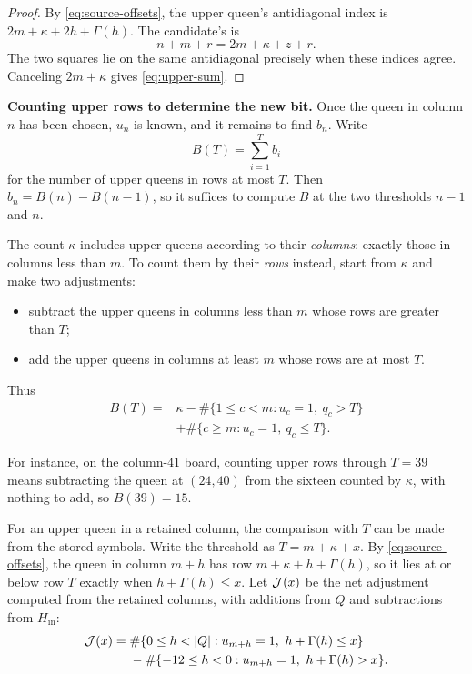 \begin{proof}
By \eqref{eq:source-offsets}, the upper queen's antidiagonal
index is $2m+\kappa+2h+\Gamma(h)$. The candidate's is
\[
 n+m+r=2m+\kappa+z+r.
\]
The two squares lie on the same antidiagonal precisely when
these indices agree. Canceling $2m+\kappa$ gives
\eqref{eq:upper-sum}.
\end{proof}

\medskip\noindent
\textbf{Counting upper rows to determine the new bit.}
Once the queen in column $n$ has been chosen, $u_n$ is known, and it
remains to find $b_n$. Write
\[
 B(T)=\sum_{i=1}^{T}b_i
\]
for the number of upper queens in rows at most $T$. Then
$b_n=B(n)-B(n-1)$, so it suffices to compute $B$ at the two
thresholds $n-1$ and $n$.

The count $\kappa$ includes upper queens according to their
\emph{columns}: exactly those in columns less than $m$. To count them by
their \emph{rows} instead, start from $\kappa$ and make two
adjustments:
\begin{itemize}
\item subtract the upper queens in columns less than $m$ whose rows are
greater than $T$;
\item add the upper queens in columns at least $m$ whose rows are at
most $T$.
\end{itemize}
Thus
\begin{equation}\label{eq:upper-row-adjustment}
 \begin{split}
 B(T)={}&\kappa-\#\{1\le c<m:u_c=1,\ q_c>T\}\\
        &+\#\{c\ge m:u_c=1,\ q_c\le T\}.
 \end{split}
\end{equation}



For instance, on the column-$41$ board, counting upper rows through
$T=39$ means subtracting the queen at $(24,40)$ from the sixteen
counted by $\kappa$, with nothing to add, so $B(39)=15$.

For an upper queen in a retained column, the comparison with $T$ can
be made from the stored symbols. Write the threshold as
$T=m+\kappa+x$. By \eqref{eq:source-offsets}, the queen in column
$m+h$ has row $m+\kappa+h+\Gamma(h)$, so it lies at or below row $T$
exactly when $h+\Gamma(h)\le x$. Let $\mathcal J(x)$ be the net adjustment
computed from the retained columns, with additions from $Q$ and
subtractions from $H_{\mathrm{in}}$:
\begin{equation}\label{eq:J}
 \begin{split}
 \J(x)={}&\#\{0\le h<|Q|:u_{m+h}=1,\ h+\Gamma(h)\le x\}\\
 &-\#\{-12\le h<0:u_{m+h}=1,\ h+\Gamma(h)>x\}.
 \end{split}
\end{equation}

